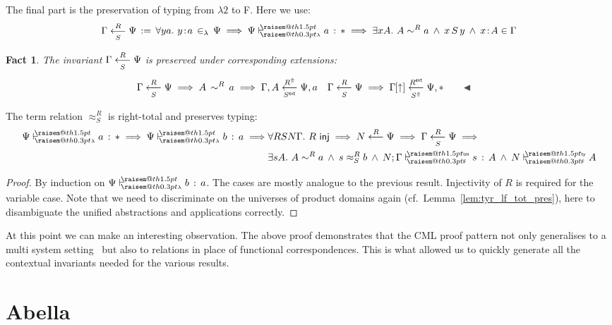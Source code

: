 \documentclass[a4paper,UKenglish]{lipics-v2016}
\makeatletter
\newcommand{\ms}{\,}
\newcommand{\mrel}[1]{\mathrel{\ms #1 \ms}}
\newcommand{\OF}{\mrel{:}}
\newcommand{\mAnd}{\mrel{\wedge}}
\newcommand{\mAll}[1]{\ensuremath{\forall} #1.\ms\ms}
\newcommand{\mEx}[1]{\ensuremath{\exists} #1.\ms\ms}
\newcommand{\eqdef}{\mrel{:=}}
\newcommand{\SysL}{$\lambda2$\xspace}
\newcommand{\ty}{\mathsf{ty}}
\newcommand{\tm}{\mathsf{tm}}
\newcommand{\of}{\ensuremath{\!:\!}}
\newcommand{\cc}[2]{#1;#2} %
\newcommand{\raisemath}[1]{\mathpalette{\raisem@th{#1}}}
\newcommand{\raisem@th}[3]{\raisebox{#1}{\ensuremath{#2#3}}}
\newcommand{\tsAnnot}[2]{\vdash\hspace{-.7em}^{\raisemath{1.5pt}{\scriptscriptstyle{#2}}}_{\raisemath{0.3pt}{\scriptscriptstyle{#1}}}} %
\newcommand{\tfF}{\tsAnnot{\mathsf{F}}{\ty}}  %
\newcommand{\tyF}{\tsAnnot{\mathsf{F}}{\tm}}  %
\newcommand{\istyF}[2]{\ensuremath{{#1} \mathrel{\tfF} #2}}
\newcommand{\typingF}[3]{\ensuremath{{#1} \mathrel{\tyF} #2 \OF #3}}
\newcommand{\tyL}{\tsAnnot{\lambda}{}} %
\newcommand{\typingL}[3]{\ensuremath{{#1} \mathrel{\tyL} #2 \OF #3}}
\newcommand{\inL}{\mrel{\in_{\lambda}}}
\newcommand{\tyr}{\mathrel{\sim}}
\newcommand{\tmr}{\mathrel{\approx}}
\newcommand{\Rext}[1]{\ensuremath{#1^{\mathsf{ext}}}}
\newcommand{\Rshift}[1]{\ensuremath{#1^{\Uparrow}}}
\newcommand{\tyctxrelLF}[3]{\ensuremath{#1\mathrel{\mathop{\longleftarrow}^{#2}\limits}#3}}
\newcommand{\tmctxrelLF}[4]{\ensuremath{#1\mathrel{\mathop{\longleftarrow}^{#2}_{#3}\limits}#4}}
\newcommand{\Prp}{\ensuremath{\textrm{\textasteriskcentered}}}
\newcommand{\subst}[1]{\hphantom{|}\!\![{#1}]}
\newcommand{\shift}{\ensuremath{\uparrow}}
\theoremstyle{plain}
\newtheorem{fact}[theorem]{Fact}
\makeatother
\begin{document}
The final part is the preservation of typing from \SysL to F.
Here we use:
\begin{align*}
  \tmctxrelLF{\Gamma}{R}{S}{\Psi} \eqdef \mAll{y a} y \of a \inL \Psi \implies \typingL{\Psi}{a}{\Prp} \implies \mEx{x A} A \tyr^R a \mAnd x\,S\,y \mAnd x \of A \in \Gamma
\end{align*}
\begin{fact}
  \label{fac:inv-tmfl-ext}
  The invariant $\tmctxrelLF{\Gamma}{R}{S}{\Psi}$ is preserved under corresponding extensions:
  \begin{align*}
    &\tmctxrelLF{\Gamma}{R}{S}{\Psi} \implies A\,\tyr^R\,a \implies \tmctxrelLF{\Gamma,A}{\Rshift{R}}{\Rext{S}}{\Psi,a} & &\tmctxrelLF{\Gamma}{R}{S}{\Psi} \implies \tmctxrelLF{\Gamma\subst{\shift}}{\Rext{R}}{\Rshift{S}}{\Psi,\Prp}\tag*{\qedsymbol}
  \end{align*}
\end{fact}
\begin{lemma}
  The term relation $\tmr^R_S$ is right-total and preserves typing:
  \begin{align*}
    \typingL{\Psi}{a}{\Prp} \implies \typingL{\Psi}{b}{a} \implies &\mAll{R S N \Gamma} R\ms\ms\mathsf{inj} \implies \tyctxrelLF{N}{R}{\Psi} \implies \tmctxrelLF{\Gamma}{R}{S}{\Psi} \implies \\
                                                                &\mEx{s A} A \tyr^R a \mAnd s \tmr^R_S b \mAnd \typingF{\cc{N}{\Gamma}}{s}{A} \mAnd \istyF{N}{A}
  \end{align*}
\end{lemma}
\begin{proof}
  By induction on $\typingL{\Psi}{b}{a}$.
  The cases are mostly analogue to the previous result.
  Injectivity of $R$ is required for the variable case.
  Note that we need to discriminate on the universes of product domains again (cf.\ Lemma~\ref{lem:tyr_lf_tot_pres}), here to disambiguate the unified abstractions and applications correctly.
\end{proof}

At this point we can make an interesting observation.
The above proof demonstrates that the CML proof pattern not only generalises to a multi system setting~\cite{KaiserEtAl:2017:sysf_pts_equiv_coq} but also to relations in place of functional correspondences.
This is what allowed us to quickly generate all the contextual invariants needed for the various results.

\section{Abella}
\label{sec:abella}
\end{document}
